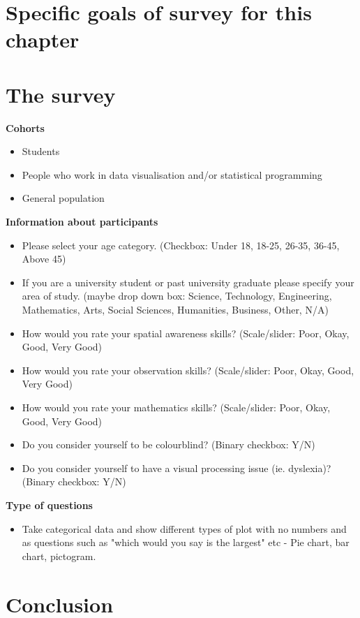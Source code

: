 \section{Specific goals of survey for this chapter}


\section{The survey}

\textbf{Cohorts}
\begin{itemize}
    \item Students
    \item People who work in data visualisation and/or statistical programming
    \item General population
\end{itemize}

\textbf{Information about participants}

\begin{itemize}
    \item Please select your age category. (Checkbox: Under 18, 18-25, 26-35, 36-45, Above 45)
    
    \item If you are a university student or past university graduate please specify your area of study. (maybe drop down box: Science, Technology, Engineering, Mathematics, Arts, Social Sciences, Humanities, Business, Other, N/A)
    
    \item How would you rate your spatial awareness skills? (Scale/slider: Poor, Okay, Good, Very Good)
    
    \item How would you rate your observation skills? (Scale/slider: Poor, Okay, Good, Very Good)
    
    \item How would you rate your mathematics skills? (Scale/slider: Poor, Okay, Good, Very Good)
    
    \item Do you consider yourself to be colourblind? (Binary checkbox: Y/N)
    
    \item Do you consider yourself to have a visual processing issue (ie. dyslexia)? (Binary checkbox: Y/N)
\end{itemize}

\noindent \textbf{Type of questions}

\begin{itemize}
    \item Take categorical data and show different types of plot with no numbers and as questions such as "which would you say is the largest" etc - Pie chart, bar chart, pictogram.
\end{itemize}


\section{Conclusion}
